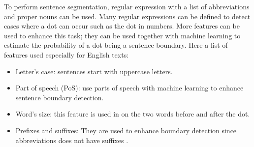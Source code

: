 To perform sentence segmentation, regular expression with a list of abbreviations \citep{89-riley,97-reynar-ratnaparkhi} and proper nouns \citep{02-mikheev} can be used. 
Many regular expressions can be defined to detect cases where a dot can occur such as the dot in numbers.
More features can be used to enhance this task; they can be used together with machine learning to estimate the probability of a dot being a sentence boundary. 
Here a list of features used especially for English texts:
\begin{itemize}
	\item Letter's case: sentences start with uppercase letters.
	\item Part of speech (PoS): \citet{97-palmer-hearst} use parts of speech with machine learning to enhance sentence boundary detection.
	\item Word's size: this feature is used in \citep{89-riley} on the two words before and after the dot.
	\item Prefixes and suffixes: They are used to enhance boundary detection since abbreviations does not have suffixes \citep{80-muller-al,97-reynar-ratnaparkhi}.
\end{itemize}


